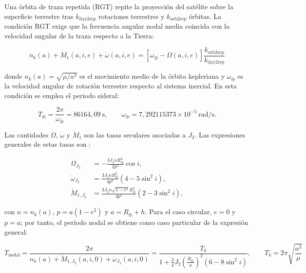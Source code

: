 Una órbita de traza repetida (RGT) repite la proyección del satélite sobre
la superficie terrestre tras $k_{\mathrm{day2rep}}$ rotaciones terrestres y
$k_{\mathrm{orb2rep}}$ órbitas. La condición RGT exige que la frecuencia
angular nodal media coincida con la velocidad angular de la traza respecto
a la Tierra:

\begin{equation}
n_k(a) + \dot{M}_1(a,i,e) + \dot{\omega}(a,i,e)
= \left[\omega_{\oplus} - \dot{\Omega}(a,i,e)\right]
\frac{k_{\mathrm{orb2rep}}}{k_{\mathrm{day2rep}}}
\label{eq:rgt_cond}
\end{equation}

donde $n_k(a)=\sqrt{\mu/a^3}$ es el movimiento medio de la órbita
kepleriana y $\omega_{\oplus}$ es la velocidad angular de rotación terrestre respecto al sistema inercial. En esta condición se emplea el periodo sideral:

\begin{equation}
T_{\oplus}=\frac{2\pi}{\omega_{\oplus}}=86164{,}09\ \mathrm{s},
\qquad
\omega_{\oplus}=7{,}292115373\times10^{-5}\ \mathrm{rad/s}.
\label{eq:earth_sidereal}
\end{equation}

Las cantidades $\dot{\Omega}$, $\dot{\omega}$ y $\dot{M}_1$ son las tasas seculares asociadas a $J_2$. Las expresiones generales de estas tasas son \cite{vallado2013fundamentals}:

\begin{align}
\dot{\Omega}_{J_2} &= -\frac{3J_2 n R_{\oplus}^{2}}{2p^{2}}\cos i,
\label{eq:Omega_dot}\\[4pt]
\dot{\omega}_{J_2} &= \frac{3J_2 n R_{\oplus}^{2}}{4p^{2}}
\left(4-5\sin^{2}i\right),
\label{eq:omega_dot}\\[4pt]
\dot{M}_{1,J_2} &= \frac{3J_2 n\sqrt{1-e^{2}}R_{\oplus}^{2}}{4p^{2}}
\left(2-3\sin^{2}i\right),
\label{eq:M1_dot}
\end{align}

con $n=n_k(a)$, $p=a(1-e^2)$ y $a=R_{\oplus}+h$. Para el caso
circular, $e=0$ y $p=a$; por tanto, el período nodal se obtiene como caso
particular de la expresión general:

\begin{equation}
T_{\mathrm{nodal}} = \frac{2\pi}
{n_k(a)+\dot{M}_{1,J_2}(a,i,0)+\dot{\omega}_{J_2}(a,i,0)}
=\frac{T_k}
{1+\frac{3}{4}J_2\left(\frac{R_{\oplus}}{a}\right)^2
\left(6-8\sin^2 i\right)},
\qquad T_k=2\pi\sqrt{\frac{a^3}{\mu}}
\label{eq:Tnodal}
\end{equation}

